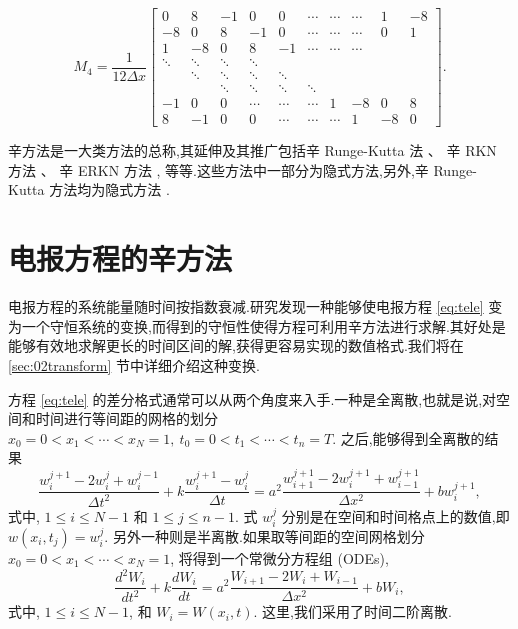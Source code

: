 \begin{equation*}
	M_4=\frac{1}{12\Delta x}\begin{bmatrix}
0 & 8 & -1 & 0 & 0 & \cdots & \cdots & \cdots & 1 & -8\\
-8 & 0 & 8 & -1 & 0 & \cdots & \cdots & \cdots & 0 & 1\\
1 & -8 & 0 & 8 & -1 & \cdots & \cdots & \cdots && \\
\ddots & \ddots & \ddots & \ddots &   &   &   &   && \\
&\ddots & \ddots & \ddots & \ddots &   &   &   &&\\
&&\ddots & \ddots & \ddots & \ddots &   &   && \\
-1 & 0 & 0 & \cdots & \cdots & \cdots & 1 & -8 & 0&8 \\
8&-1 & 0 & 0 & \cdots  & \cdots & \cdots & 1 & -8 & 0
\end{bmatrix}.
\end{equation*}

辛方法是一大类方法的总称,其延伸及其推广包括辛 Runge-Kutta 法 \cite{feng2010symplectic,burrage2014structure}、 辛 RKN 方法 \cite{monovasilis2013exponentially}、 辛 ERKN 方法 \cite{yang2009extended}, 等等.这些方法中一部分为隐式方法,另外,辛 Runge-Kutta 方法均为隐式方法 \cite{sanz1988runge}.

\section{电报方程的辛方法}\label{sec:02telegraph}

电报方程的系统能量随时间按指数衰减.研究发现一种能够使电报方程 \eqref{eq:tele} 变为一个守恒系统的变换,而得到的守恒性使得方程可利用辛方法进行求解.其好处是能够有效地求解更长的时间区间的解,获得更容易实现的数值格式.我们将在 \ref{sec:02transform} 节中详细介绍这种变换.

方程 \eqref{eq:tele} 的差分格式通常可以从两个角度来入手.一种是全离散,也就是说,对空间和时间进行等间距的网格的划分 $x_0=0<x_1<\cdots<x_N=1,~t_0=0<t_1<\cdots<t_n=T$. 之后,能够得到全离散的结果
\begin{equation}\label{eq:fulld}
\frac{w_{i}^{j+1}-2w_{i}^{j}+w_{i}^{j-1}}{\Delta t^2}+k\frac{w_{i}^{j+1}-w_{i}^{j}}{\Delta t}=a^2
\frac{w_{i+1}^{j+1}-2w_{i}^{j+1}+w_{i-1}^{j+1}}{\Delta x^2} + b w_{i}^{j+1},
\end{equation}
式中, $1 \le i \le N-1$ 和 $1 \le j \le n-1$. 式 $w_{i}^{j}$ 分别是在空间和时间格点上的数值,即$w(x_i,t_j)=w_{i}^{j}$.
另外一种则是半离散.如果取等间距的空间网格划分 $x_0=0<x_1<\cdots<x_N=1$, 将得到一个常微分方程组 (ODEs),
\begin{equation*}
\frac{d^2 W_i}{d t^2}+k\frac{d W_i}{d t}=a^2 \frac{W_{i+1}-2W_{i}+W_{i-1}}{\Delta x^2} + b W_i,
\end{equation*}
式中, $1 \le i \le N-1$, 和 $W_i = W(x_i,t)$. 这里,我们采用了时间二阶离散.


